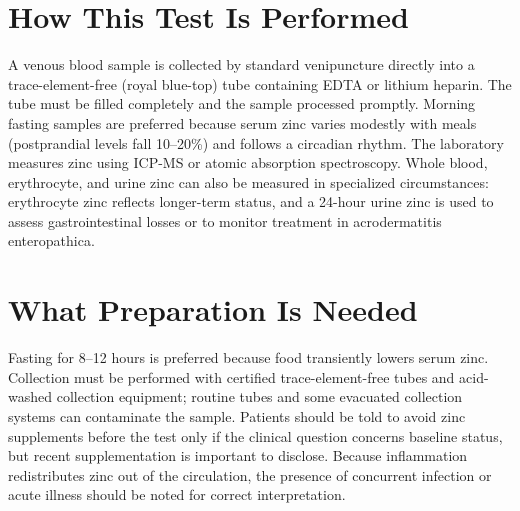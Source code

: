\section*{How This Test Is Performed}
A venous blood sample is collected by standard venipuncture directly into a trace-element-free (royal blue-top) tube containing EDTA or lithium heparin. The tube must be filled completely and the sample processed promptly. Morning fasting samples are preferred because serum zinc varies modestly with meals (postprandial levels fall 10--20\%) and follows a circadian rhythm. The laboratory measures zinc using ICP-MS or atomic absorption spectroscopy. Whole blood, erythrocyte, and urine zinc can also be measured in specialized circumstances: erythrocyte zinc reflects longer-term status, and a 24-hour urine zinc is used to assess gastrointestinal losses or to monitor treatment in acrodermatitis enteropathica.

\section*{What Preparation Is Needed}
Fasting for 8--12 hours is preferred because food transiently lowers serum zinc. Collection must be performed with certified trace-element-free tubes and acid-washed collection equipment; routine tubes and some evacuated collection systems can contaminate the sample. Patients should be told to avoid zinc supplements before the test only if the clinical question concerns baseline status, but recent supplementation is important to disclose. Because inflammation redistributes zinc out of the circulation, the presence of concurrent infection or acute illness should be noted for correct interpretation.

